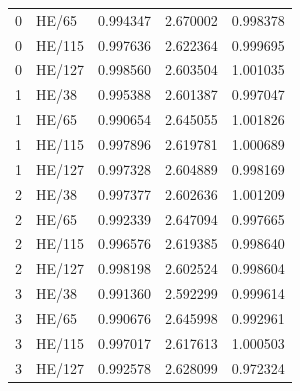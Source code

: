 \begin{table}[t]
\begin{minipage}[t]{.485\textwidth}
\begin{tabular}{@{}rlrrr@{}}
0 & HE/65 & 0.994347 & 2.670002 & 0.998378\\
0 & HE/115 & 0.997636 & 2.622364 & 0.999695\\
0 & HE/127 & 0.998560 & 2.603504 & 1.001035\\
1 & HE/38 & 0.995388 & 2.601387 & 0.997047\\
1 & HE/65 & 0.990654 & 2.645055 & 1.001826\\
1 & HE/115 & 0.997896 & 2.619781 & 1.000689\\
1 & HE/127 & 0.997328 & 2.604889 & 0.998169\\
2 & HE/38 & 0.997377 & 2.602636 & 1.001209\\
2 & HE/65 & 0.992339 & 2.647094 & 0.997665\\
2 & HE/115 & 0.996576 & 2.619385 & 0.998640\\
2 & HE/127 & 0.998198 & 2.602524 & 0.998604\\
3 & HE/38 & 0.991360 & 2.592299 & 0.999614\\
3 & HE/65 & 0.990676 & 2.645998 & 0.992961\\
3 & HE/115 & 0.997017 & 2.617613 & 1.000503\\
3 & HE/127 & 0.992578 & 2.628099 & 0.972324\\
\bottomrule\end{tabular}\end{minipage}
\end{table}
